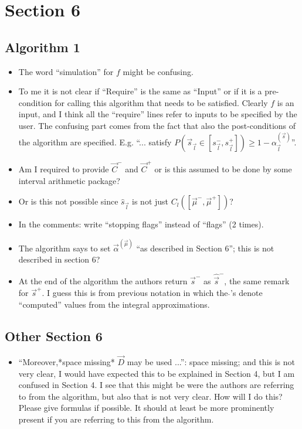\documentclass{article}[12pt]
\newcommand{\RefereeTODO}[1]{{\color{red} #1 \newline}}
\begin{document}
\section{Section 6}

\subsection{Algorithm 1}

\begin{itemize}
    \item \RefereeTODO{The word ``simulation'' for $f$ might be confusing.}
    \item \RefereeTODO{To me it is not clear if ``Require'' is the same as ``Input'' or if it is a pre-condition for calling this algorithm that needs to be satisfied. Clearly $f$ is an input, and I think all the ``require'' lines refer to inputs to be specified by the user. The confusing part comes from the fact that also the post-conditions of the algorithm are specified. E.g. ``... satisfy $P(\vec{s}_{\vec{l}} \in [s_{\vec{l}}^-, s_{\vec{l}}^+]) \ge 1 -\alpha_{\vec{l}}^{(\vec{s})}$''.}
    \item \RefereeTODO{Am I required to provide $\vec{C}^-$ and $\vec{C}^+$ or is this assumed to be done by some interval arithmetic package?}
    \item \RefereeTODO{Or is this not possible since $\hat{s}_{\vec{l}}$ is not just $C_l([\vec{\mu}^-,\vec{\mu}^+])$?}
    \item \RefereeTODO{In the comments: write ``stopping flags'' instead of ``flags'' (2 times).}
    \item \RefereeTODO{The algorithm says to set ${\vec{\alpha}}^{(\vec{\mu})}$ ``as described in Section 6''; this is not described in section 6?}
    \item \RefereeTODO{At the end of the algorithm the authors return $\vec{s}^-$ as $\hat{\vec{s}}^-$, the same remark for $\vec{s}^+$. I guess this is from previous notation in which the $\hat{}$'s denote ``computed'' values from the integral approximations.}
\end{itemize}

\subsection{Other Section 6}

\begin{itemize}
    \item \RefereeTODO{``Moreover,*space missing* $\vec{D}$ may be used ...'': space missing; and this is not very clear, I would have expected this to be explained in Section 4, but I am confused in Section 4. I see that this might be were the authors are referring to from the algorithm, but also that is not very clear. How will I do this? Please give formulas if possible. It should at least be more prominently present if you are referring to this from the algorithm.}
\end{itemize}
\end{document}
